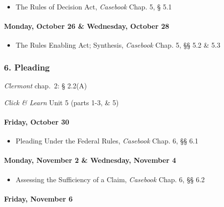 \documentclass[11pt,letterpaper,twoside]{article}
\providecommand{\tightlist}{%
\setlength{\itemsep}{0em}\setlength{\parskip}{0em}\setlength{\itemindent}{0em}}
\begin{document}
\begin{itemize}
\tightlist
\item
  The Rules of Decision Act, \emph{Casebook} Chap. 5, § 5.1
\end{itemize}

\paragraph{Monday, October 26 \& Wednesday, October
28}\label{monday-october-26-wednesday-october-28}

\begin{itemize}
\tightlist
\item
  The Rules Enabling Act; Synthesis, \emph{Casebook} Chap. 5, §§ 5.2 \&
  5.3
\end{itemize}

\subsubsection{6. Pleading}\label{pleading}

\emph{Clermont} chap.~2: § 2.2(A)

\emph{Click \& Learn} Unit 5 (parts 1-3, \& 5)

\paragraph{Friday, October 30}\label{friday-october-30}

\begin{itemize}
\tightlist
\item
  Pleading Under the Federal Rules, \emph{Casebook} Chap. 6, §§ 6.1
\end{itemize}

\paragraph{Monday, November 2 \& Wednesday, November
4}\label{monday-november-2-wednesday-november-4}

\begin{itemize}
\tightlist
\item
  Assessing the Sufficiency of a Claim, \emph{Casebook} Chap. 6, §§ 6.2
\end{itemize}

\paragraph{Friday, November 6}\label{friday-november-6}
\end{document}
